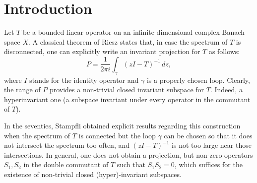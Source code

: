\documentclass[11pt]{amsart}
\theoremstyle{definition}
\theoremstyle{remark}
\numberwithin{equation}{section}
\begin{document}
	
	\begin{abstract}
In this work, we prove that linear bounded operators $T$ on a Banach space $X$ allowing spectral cuts along rectifiable Jordan curves meeting their spectrum are related to classes of operators admitting an \emph{unconventional functional calculus}. We identify several such classes and address the consequences regarding the existence of non-trivial closed invariant subspaces, extending previous results of Chalendar \cite{Chalendar1996, Chalendar1997, Chalendar1998}. Furthermore, we establish that every operator belonging to a broad subclass of compact perturbations of diagonalizable normal operators on separable Hilbert spaces — namely, trace-class perturbations — possesses an unconventional functional calculus and is \emph{super-decomposable}, thereby extending earlier results obtained by the authors in \cite{GG3}.
\end{abstract}
	
	\maketitle
	
	
	
	\section{Introduction}
	
	
	Let $T$ be a bounded linear operator on an infinite-dimensional complex Banach space $X$. A classical theorem of Riesz states that, in case the spectrum of $T$ is disconnected, one can explicitly write an  invariant projection for $T$ as follows:
	$$
	P = \frac{1}{2\pi i} \int_{\gamma} (zI - T)^{-1} \, dz,
	$$
	where $I$ stands for the identity operator and $\gamma$ is a properly chosen loop. Clearly, the range of $P$ provides a non-trivial closed invariant subspace for $T$. Indeed, a hyperinvariant one (a subspace invariant under every operator in the commutant of $T$).
	
	\smallskip
	
	In the seventies, Stampfli \cite{Stampfli} obtained explicit results regarding this construction when the spectrum of $T$ is connected but the loop $\gamma $ can be chosen so that it does not intersect the spectrum too often, and $(zI - T)^{-1} $ is not too large near those intersections. In general, one does not obtain a projection, but non-zero operators $S_1, S_2$ in the double commutant of $T$ such that $S_1 S_2 = 0$, which suffices for the existence of non-trivial closed (hyper)-invariant subspaces.
	
\end{document}

